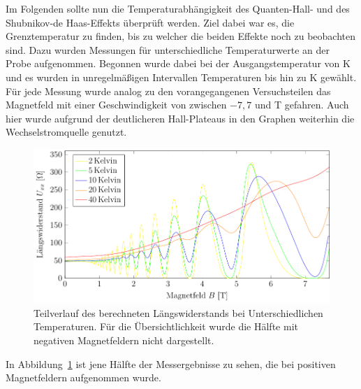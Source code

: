 
Im Folgenden sollte nun die Temperaturabhängigkeit des Quanten-Hall- und des Shubnikov-de Haas-Effekts überprüft werden. Ziel dabei war es, die Grenztemperatur zu finden, bis zu welcher die beiden Effekte noch zu beobachten sind. 
Dazu wurden Messungen für unterschiedliche Temperaturwerte an der Probe aufgenommen. Begonnen wurde dabei bei der Ausgangstemperatur von \unit[2]{K} und es wurden in unregelmäßigen Intervallen Temperaturen bis hin zu \unit[40]{K} gewählt. Für jede Messung wurde analog zu den vorangegangenen Versuchsteilen das Magnetfeld mit einer Geschwindigkeit von  zwischen $-7,7$ und \unit[7,7]{T} gefahren. Auch hier wurde aufgrund der deutlicheren Hall-Plateaus in den Graphen weiterhin die Wechselstromquelle genutzt.


\begin{figure}[h]
	\centering
	\includegraphics[scale=1]{graphs/temperatur/full_range.pdf}
	\caption[Hall-Widerstand unter Temperaturvariation]{
		Teilverlauf des berechneten Längswiderstands bei Unterschiedlichen Temperaturen. Für die Übersichtlichkeit wurde die Hälfte mit negativen Magnetfeldern nicht dargestellt.
	}
	\label{fig:temp_mess}
\end{figure}

In Abbildung~\ref{fig:temp_mess} ist jene Hälfte der Messergebnisse zu sehen, die bei positiven Magnetfeldern aufgenommen wurde.